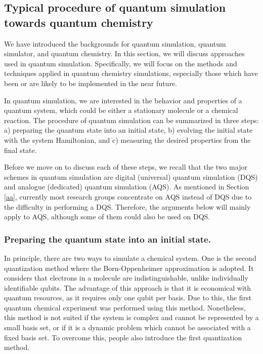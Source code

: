 \documentclass[8.5pt,twoside,twocolumn]{article}
\begin{document}
\subsection{Typical procedure of quantum simulation towards quantum chemistry}

We have introduced the backgrounds for quantum simulation,
quantum simulator, and quantum chemistry.
In this section, we will discuss approaches used in quantum simulation.
Specifically, we will focus on the methods and techniques applied
in quantum chemistry simulations, especially those which have been
or are likely to be implemented in the near future.

In quantum simulation, we are interested
in  the behavior and properties of a quantum system,
which could be either a stationary molecule or a chemical reaction.
The procedure of quantum simulation
can be summarized in three steps:
a) preparing the quantum state into an initial state,
b) evolving the initial state with the system Hamiltonian, and
c) measuring the desired properties from the final state.

Before we move on to discuss each of these steps,
we recall that the
two major schemes in quantum simulation
are digital (universal) quantum simulation (DQS)
and analogue (dedicated) quantum simulation (AQS).
As mentioned in Section \ref{aa},
currently most research groups concentrate on AQS
instead of DQS due to the difficulty in performing a DQS.
Therefore, the arguments below will mainly apply to AQS,
although some of them could also be used on DQS.

\subsubsection{Preparing the quantum state into an initial state.}

In principle, there are two ways to
simulate a chemical system.\cite{Simulating_chemistry_computer}
One is the second quantization method where the
Born-Oppenheimer approximation is adopted.
It considers that electrons in a molecule
are indistinguishable, unlike individually identifiable qubits.
The advantage of this approach is that
it is economical with quantum resources,
as it requires only one qubit per basis.
Due to this, the first quantum chemical experiment
was performed using this method.\cite{Optics_static}
Nonetheless, this method is not suited
if the system is complex and cannot be
represented by a small basis set,
or if it is a dynamic
problem which cannot be associated with a fixed basis set.
To overcome this, people also introduce the first quantization method.
\end{document}
